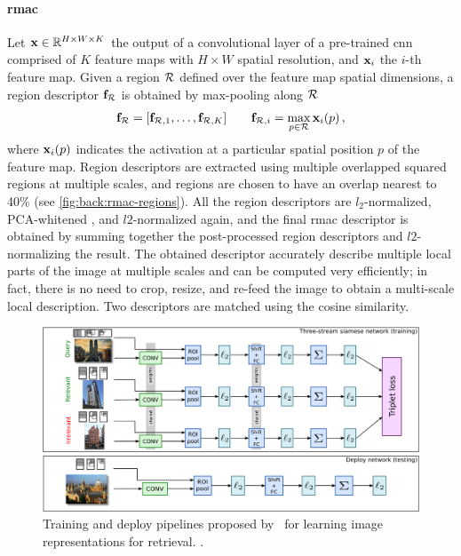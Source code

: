 \paragraph{\acrlong{rmac}}
Let $\mathbf{x} \in \mathbb{R}^{H \times W \times K}$ the output of a convolutional layer of a pre-trained \gls{cnn} comprised of $K$ feature maps with $H \times W$ spatial resolution, and $\mathbf{x}_i$ the $i$-th feature map.
Given a region $\mathcal{R}$ defined over the feature map spatial dimensions, a region descriptor $\mathbf{f}_{\mathcal{R}}$ is obtained by max-pooling along $\mathcal{R}$
\begin{equation} \label{eq:back:rmac-region}
\mathbf{f}_{\mathcal{R}} = [\mathbf{f}_{\mathcal{R},1}, \ldots, \mathbf{f}_{\mathcal{R},K}] \qquad \mathbf{f}_{\mathcal{R},i} = \max_{p \in \mathcal{R}} \mathbf{x}_i(p) \,,
\end{equation}
where $\mathbf{x}_i(p)$ indicates the activation at a particular spatial position $p$ of the feature map.
Region descriptors are extracted using multiple overlapped squared regions at multiple scales, and regions are chosen to have an overlap nearest to 40\% (see \ref{fig:back:rmac-regions}).
All the region descriptors are $l_2$-normalized, PCA-whitened%
, and $l2$-normalized again, and the final \gls{rmac} descriptor is obtained by summing together the post-processed region descriptors and $l2$-normalizing the result.
The obtained descriptor accurately describe multiple local parts of the image at multiple scales and can be computed very efficiently;
in fact, there is no need to crop, resize, and re-feed the image to obtain a multi-scale local description.
Two descriptors are matched using the cosine similarity.

\begin{figure}
    \centering
    \includegraphics[width=\linewidth]{rmac-trained}
    \caption{Training and deploy pipelines proposed by~\citet{gordo2016deep,gordo2017end} for learning image representations for retrieval. .}
    \label{fig:back:rmac-trained}
\end{figure}

